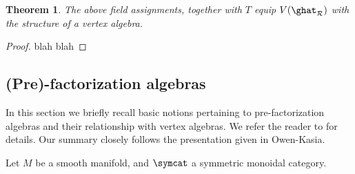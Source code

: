 \documentclass[12pt]{amsart}
\newtheorem{theorem}{Theorem}[section]
\theoremstyle{definition}
\theoremstyle{remark}
\newcommand{\R}{\mathcal{R}}
\begin{document}
\begin{theorem}
The above field assignments, together with $T$ equip $V(\ghat_{\R})$ with the structure of a vertex algebra.
\end{theorem}

\begin{proof}
blah blah
\end{proof}

\subsection{(Pre)-factorization algebras}

In this section we briefly recall basic notions pertaining to pre-factorization algebras and their relationship with vertex algebras. We refer the reader to \cite{CG} for details. Our summary closely follows the presentation given in \cite{} {\color{red} Owen-Kasia}. 

Let $M$ be a smooth manifold, and $\symcat$ a symmetric monoidal category. 
\end{document}
